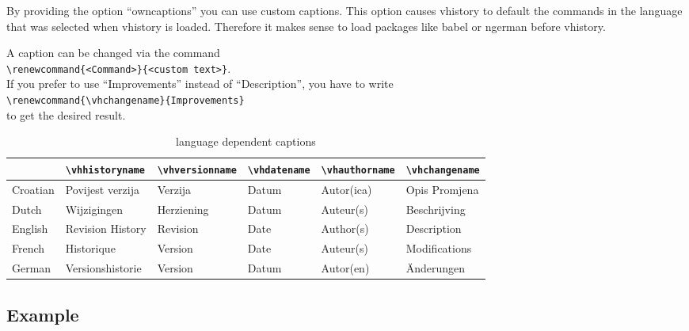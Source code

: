 By providing the option ``owncaptions'' you can use custom captions. This option causes vhistory to default the commands in the language that was selected when vhistory is loaded. Therefore it makes sense to load packages like babel or ngerman before vhistory.

A caption can be changed via the command\\
\mbox{}\hspace{2em}\verb|\renewcommand{<Command>}{<custom text>}|.\\
If you prefer to use ``Improvements'' instead of ``Description'', you have to write\\
\mbox{}\hspace{2em}\verb|\renewcommand{\vhchangename}{Improvements}|\\
to get the desired result.

\begin{table}%
\begin{center}
\begin{scriptsize}
\begin{tabular}{llllll}\hline
& \verb|\vhhistoryname| & \verb|\vhversionname| & \verb|\vhdatename| & \verb|\vhauthorname| & \verb|\vhchangename|\\ \hline
Croatian & Povijest verzija & Verzija & Datum & Autor(ica) & Opis Promjena\\
Dutch & Wijzigingen & Herziening & Datum & Auteur(s) & Beschrijving\\
English & Revision History & Revision & Date & Author(s) & Description\\
French & Historique & Version & Date & Auteur(s) & Modifications\\
German & Versionshistorie & Version & Datum & Autor(en) & Änderungen\\ \hline
\end{tabular}
\end{scriptsize}
\caption{language dependent captions}
\label{tab:languages}
\end{center}
\end{table}

\subsection{Example}

